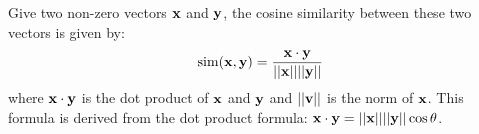 \begin{definition}
  Give two non-zero vectors $\bf{x}$ and $\bf{y}$, the cosine similarity between these two vectors is given by:
  \begin{equation}
    \operatorname{sim}(\bf{x}, \bf{y})=\frac{\bf{x}\cdot\bf{y}}{||\bf{x}||||\bf{y}||}
  \end{equation}
  where $\bf{x}\cdot\bf{y}$ is the dot product of $\bf{x}$ and $\bf{y}$ and $||\bf{v}||$ is the norm of $\bf{x}$.
  This formula is derived from the dot product formula: $\bf{x}\cdot\bf{y}=||\bf{x}||||\bf{y}||\cos\theta$.
\end{definition}

